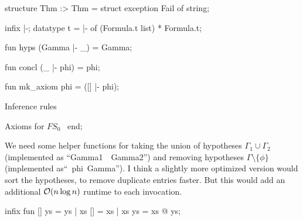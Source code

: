 \nwenddocs{}\endmoddef\nwstartdeflinemarkup\nwenddeflinemarkup
structure Thm :> Thm = struct
exception Fail of string;

infix |-;
datatype t = |- of (Formula.t list) * Formula.t;

fun hyps (Gamma |- _) = Gamma;

fun concl (_ |- phi) = phi;

fun mk_axiom phi = ([] |- phi); 

\LA{}Inference rules~{\nwtagstyle{}}\RA{}

\LA{}Axioms for $FS_{0}$~{\nwtagstyle{}}\RA{}
end;
\eatline
{}\nwendcode{}\nwdocspar
\begin{node}
We need some helper functions for taking the union of hypotheses
$\Gamma_{1}\cup\Gamma_{2}$ (implemented as ``{\Tt{}Gamma1\ \ Gamma2\nwendquote}'')
and removing hypotheses $\Gamma\setminus\{\phi\}$ (implemented as``{\Tt{}\ phi\ Gamma\nwendquote}'').
I think a slightly more optimized version would sort the hypotheses,
to remove duplicate entries faster. But this would add
an additional $\operatorname{\mathcal{O}}(n\log n)$ runtime to each invocation.
\end{node}

\nwenddocs{}\endmoddef\nwstartdeflinemarkup{}\nwenddeflinemarkup
infix 
fun []  ys = ys
  | xs  [] = xs
  | xs  ys = xs @ ys;

